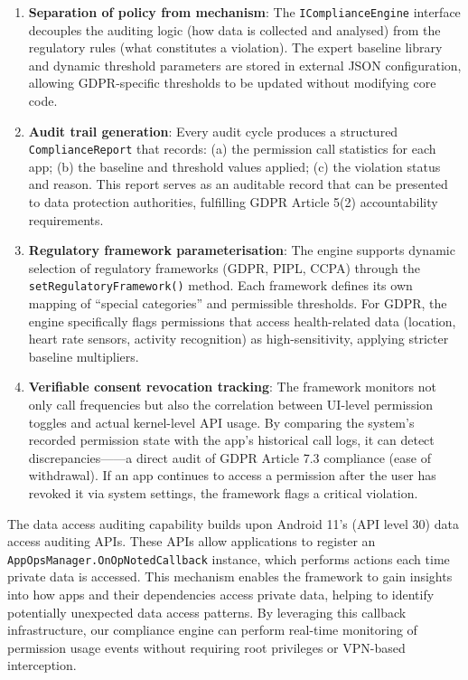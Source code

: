 \begin{enumerate}
\item \textbf{Separation of policy from mechanism}: The \texttt{IComplianceEngine} interface decouples the auditing logic (how data is collected and analysed) from the regulatory rules (what constitutes a violation). The expert baseline library and dynamic threshold parameters are stored in external JSON configuration, allowing GDPR-specific thresholds to be updated without modifying core code.
\item \textbf{Audit trail generation}: Every audit cycle produces a structured \texttt{ComplianceReport} that records: (a) the permission call statistics for each app; (b) the baseline and threshold values applied; (c) the violation status and reason. This report serves as an auditable record that can be presented to data protection authorities, fulfilling GDPR Article 5(2) accountability requirements.
\item \textbf{Regulatory framework parameterisation}: The engine supports dynamic selection of regulatory frameworks (GDPR, PIPL, CCPA) through the \texttt{setRegulatoryFramework()} method. Each framework defines its own mapping of ``special categories'' and permissible thresholds. For GDPR, the engine specifically flags permissions that access health-related data (location, heart rate sensors, activity recognition) as high-sensitivity, applying stricter baseline multipliers.
\item \textbf{Verifiable consent revocation tracking}: The framework monitors not only call frequencies but also the correlation between UI-level permission toggles and actual kernel-level API usage. By comparing the system's recorded permission state with the app's historical call logs, it can detect discrepancies——a direct audit of GDPR Article 7.3 compliance (ease of withdrawal). If an app continues to access a permission after the user has revoked it via system settings, the framework flags a critical violation.
\end{enumerate}

The data access auditing capability builds upon Android 11's (API level 30) data access auditing APIs. These APIs allow applications to register an \texttt{AppOpsManager.OnOpNotedCallback} instance, which performs actions each time private data is accessed. This mechanism enables the framework to gain insights into how apps and their dependencies access private data, helping to identify potentially unexpected data access patterns. By leveraging this callback infrastructure, our compliance engine can perform real-time monitoring of permission usage events without requiring root privileges or VPN-based interception.

